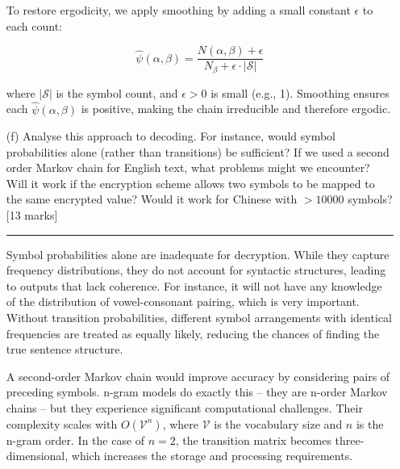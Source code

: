\documentclass{article}
\begin{document}
\begin{enumerate}
     \vspace{0.8em}
        
    To restore ergodicity, we apply smoothing by adding a small constant \( \epsilon \) to each count:
    
    \begin{equation}
    \hat{\psi}(\alpha, \beta) = \frac{N(\alpha, \beta) + \epsilon}{N_\beta + \epsilon \cdot |\mathcal{S}|}
    \end{equation}
    
    where \( |\mathcal{S}| \) is the symbol count, and \( \epsilon > 0 \) is small (e.g., 1). Smoothing ensures each \( \hat{\psi}(\alpha, \beta) \) is positive, making the chain irreducible and therefore ergodic.

    \vspace{10pt}

    \item[(f)] Analyse this approach to decoding. For instance, would symbol probabilities alone (rather than transitions) be sufficient? If we used a second order Markov chain for English text, what problems might we encounter? Will it work if the encryption scheme allows two symbols to be mapped to the same encrypted value? Would it work for Chinese with \( > 10000 \) symbols? [13 marks]
    
    \noindent\textcolor{gray}{\rule{0.1\linewidth}{0.4pt}}
    \vspace{10pt}

    Symbol probabilities alone are inadequate for decryption. While they capture frequency distributions, they do not account for syntactic structures, leading to outputs that lack coherence. For instance, it will not have any knowledge of the distribution of vowel-consonant pairing, which is very important. Without transition probabilities, different symbol arrangements with identical frequencies are treated as equally likely, reducing the chances of finding the true sentence structure.
    \vspace{0.8em}
    
    A second-order Markov chain would improve accuracy by considering pairs of preceding symbols. n-gram models do exactly this – they are n-order Markov chains – but they experience significant computational challenges. Their complexity scales with \(O\left( \mathcal{V}^n \right)\), where  \(\mathcal{V}\) is the vocabulary size and \(n\) is the n-gram order. In the case of \(n=2\), the transition matrix becomes three-dimensional, which increases the storage and processing requirements. 
    \vspace{0.8em}
    

\end{enumerate}
\end{document}
